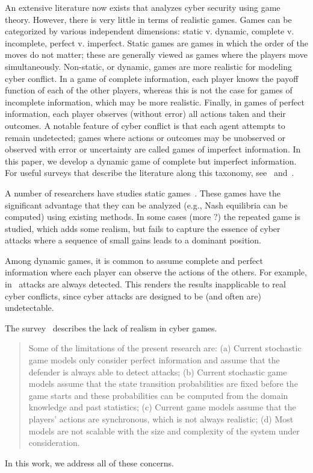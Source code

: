 An extensive literature now exists that analyzes cyber security using
game theory. However, there is very little in terms of realistic
games. Games can be categorized by various independent dimensions:
static v. dynamic, complete v. incomplete, perfect
v. imperfect. Static games are games in which the order of the moves
do not matter; these are generally viewed as games where the players
move simultaneously. Non-static, or dynamic, games are more realistic
for modeling cyber conflict. In a game of complete information, each
player knows the payoff function of each of the other players, whereas
this is not the case for games of incomplete information, which may be
more realistic. Finally, in games of perfect information, each player
observes (without error) all actions taken and their outcomes. A
notable feature of cyber conflict is that each agent attempts to
remain undetected; games where actions or outcomes may be unobserved
or observed with error or uncertainty are called games of imperfect
information. In this paper, we develop a dynamic game of complete but
imperfect information. For useful surveys that describe the literature
along this taxonomy, see~\cite{liang2013game}
and~\cite{roy2010survey}. 

A number of researchers have studies static games~\cite{}. These games
have the significant advantage that they can be analyzed (e.g., Nash
equilibria can be computed) using existing methods. In some cases
(more \cites{}?) the repeated game is studied, which adds some realism,
but fails to capture the essence of cyber attacks where a sequence of
small gains leads to a dominant position.

Among dynamic games, it is common to assume complete and perfect
information where each player can observe the actions of the
others. For example, in~\cite{} attacks are always detected. This
renders the results inapplicable to real cyber conflicts, since cyber
attacks are designed to be (and often are) undetectable.


The survey~\cite{roy2010survey} describes the lack of realism in cyber
games.
\begin{quote}
  Some of the limitations of the present research are: (a) Current
  stochastic game models only consider perfect information and
  assume that the defender is always able to detect attacks; (b)
  Current stochastic game models assume that the state transition
  probabilities are fixed before the game starts and these
  probabilities can be computed from the domain knowledge and past
  statistics; (c) Current game models assume that the players’ actions
  are synchronous, which is not always realistic; (d) Most models are
  not scalable with the size and complexity of the system under
  consideration.
\end{quote}
In this work, we address all of these concerns.


